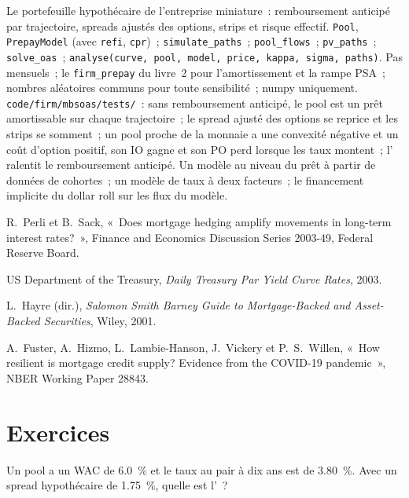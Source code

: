 \begin{build}
 Le portefeuille hypothécaire de l'entreprise miniature~: remboursement anticipé
par trajectoire, spreads ajustés des options, strips et risque effectif.
 \texttt{Pool}, \texttt{PrepayModel} (avec \texttt{refi},
\texttt{cpr})~; \texttt{simulate\_paths}~; \texttt{pool\_flows}~; \texttt{pv\_paths}~;
\texttt{solve\_oas}~; \texttt{analyse(curve, pool, model, price, kappa, sigma, paths)}.
 Pas mensuels~; le \texttt{firm\_prepay} du livre~2 pour l'amortissement et la
rampe PSA~; nombres aléatoires communs pour toute sensibilité~; numpy uniquement.
 \texttt{code/firm/mbsoas/tests/}~: sans remboursement anticipé, le
pool est un prêt amortissable sur chaque trajectoire~; le spread ajusté des options se reprice et les
strips se somment~; un pool proche de la monnaie a une convexité négative et un coût d'option positif, son IO
gagne et son PO perd lorsque les taux montent~; l' ralentit le remboursement anticipé.
 Un modèle au niveau du prêt à partir de données de cohortes~; un
modèle de taux à deux facteurs~; le financement implicite du dollar roll sur les flux du modèle.
\end{build}

\begin{omsources}
\item R.\ Perli et B.\ Sack, «~Does mortgage hedging amplify movements in long-term
interest rates?~», Finance and Economics Discussion Series 2003-49, Federal Reserve Board.
\item US Department of the Treasury, \emph{Daily Treasury Par Yield Curve Rates}, 2003.
\item L.\ Hayre (dir.), \emph{Salomon Smith Barney Guide to Mortgage-Backed and
Asset-Backed Securities}, Wiley, 2001.
\item A.\ Fuster, A.\ Hizmo, L.\ Lambie-Hanson, J.\ Vickery et P.\ S.\ Willen, «~How resilient is
mortgage credit supply? Evidence from the COVID-19 pandemic~», NBER Working Paper 28843.
\end{omsources}

\section{Exercices}

\begin{exercise}[$\star$]\label{exo:rc:mortgage-modelling:1}
Un pool a un WAC de 6.0~\% et le taux au pair à dix ans est de 3.80~\%. Avec un spread hypothécaire
de 1.75~\%, quelle est l'~?
\end{exercise}

